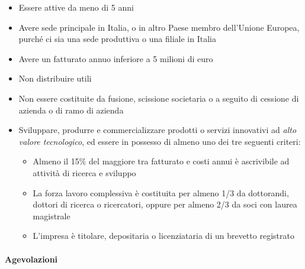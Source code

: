 \documentclass[10pt,a4paper,fleqn,oneside]{book}
\begin{document}
\begin{itemize}
    \item  Essere attive da meno di 5 anni
    \item Avere sede principale in Italia, o in altro Paese membro dell’Unione Europea, purché ci sia una
    sede produttiva o una filiale in Italia
    \item Avere un fatturato annuo inferiore a 5 milioni di euro
    \item Non distribuire utili
    \item Non essere costituite da fusione, scissione societaria o a seguito di cessione di azienda o di ramo
    di azienda
    \item Sviluppare, produrre e commercializzare prodotti o servizi innovativi ad \emph{alto valore tecnologico},
    ed essere in possesso di almeno uno dei tre seguenti criteri:
    \begin{itemize}
        \item Almeno il 15\% del maggiore tra fatturato e costi annui è ascrivibile ad attività di ricerca e
        sviluppo
        \item La forza lavoro complessiva è costituita per almeno 1/3 da dottorandi, dottori di ricerca o
        ricercatori, oppure per almeno 2/3 da soci con laurea magistrale
        \item L’impresa è titolare, depositaria o licenziataria di un brevetto registrato
    \end{itemize}
\end{itemize}

\paragraph{Agevolazioni}
\end{document}
